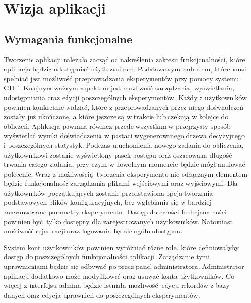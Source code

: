 \chapter{Wizja aplikacji}



\section{Wymagania funkcjonalne}
Tworzenie aplikacji należało zacząć od nakreślenia zakresu funkcjonalności, które aplikacja będzie udostępniać użytkownikom. Podstawowym zadaniem, które musi spełniać jest możliwość przeprowadzania eksperymentów przy pomocy systemu GDT. Kolejnym ważnym aspektem jest możliwość zarządzania, wyświetlania, udostępniania oraz edycji poszczególnych eksperymentów. Każdy z użytkowników powinien konkretnie widzieć, które z przeprowadzanych przez niego doświadczeń zostały już ukończone, a które jeszcze są w trakcie lub czekają w kolejce do obliczeń. Aplikacja powinna również przede wszystkim w przejrzysty sposób wyświetlać wyniki doświadczenia w postaci wygenerowanego drzewa decyzyjnego i poszczególnych statystyk. Podczas uruchomienia nowego zadania do obliczenia, użytkownikowi zostanie wyświetlony pasek postępu oraz oszacowana długość trwania całego zadania, przy czym w dowolnym momencie będzie mógł anulować polecenie.  Wraz z możliwością tworzenia eksperymentu nie odłącznym elementem będzie funkcjonalność zarządzania plikami wejściowymi oraz wyjściowymi. Dla użytkowników początkujących zostanie przedstawiona opcja tworzenia podstawowych plików konfiguracyjnych, bez wgłębiania się w bardziej zaawansowane parametry eksperymentu. Dostęp do całości funkcjonalności powinien być tylko dostępny dla zarejestrowanych użytkowników. Natomiast możliwość rejestracji oraz logowania będzie ogólnodostępna.

System kont użytkowników powinien wyróżniać różne role, które definiowałyby dostęp do poszczególnych funkcjonalności aplikacji. Zarządzanie tymi uprawnieniami będzie się odbywać po przez panel administratora. Administrator aplikacji dodatkowo może modyfikować oraz usuwać konta użytkowników. Co więcej z interfejsu admina będzie istniała możliwość edycji rekordów z bazy danych oraz edycja uprawnień do poszczególnych eksperymentów. 

